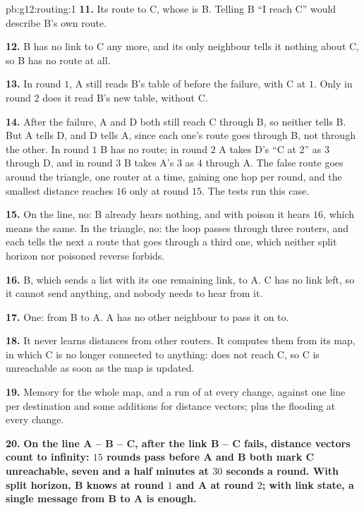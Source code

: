 \begin{solution}{pb:g12:routing:1}
\textbf{11.} Its route to C, whose  is B. Telling B ``I reach C'' would describe B's own route.

\textbf{12.} B has no link to C any more, and its only neighbour tells it nothing about C, so B has no route at all.

\textbf{13.} In round $1$, A still reads B's table of before the failure, with C at $1$. Only in round $2$ does it
read B's new table, without C.

\textbf{14.} After the failure, A and D both still reach C through B, so neither tells B. But A tells D, and D tells
A, since each one's route goes through B, not through the other. In round $1$ B has no route; in round $2$ A takes
D's ``C at $2$'' as $3$ through D, and in round $3$ B takes A's $3$ as $4$ through A. The false route goes around the
triangle, one router at a time, gaining one hop per round, and the smallest distance reaches $16$ only at round
$15$. The tests run this case.

\textbf{15.} On the line, no: B already hears nothing, and with poison it hears $16$, which means the same. In the
triangle, no: the loop passes through three routers, and each tells the next a route that goes through a third one,
which neither split horizon nor poisoned reverse forbids.

\textbf{16.} B, which sends a list with its one remaining link, to A. C has no link left, so it cannot send anything,
and nobody needs to hear from it.

\textbf{17.} One: from B to A. A has no other neighbour to pass it on to.

\textbf{18.} It never learns distances from other routers. It computes them from its map, in which C is no longer
connected to anything:  does not reach C, so C is unreachable as soon as the map is updated.

\textbf{19.} Memory for the whole map, and a run of  at every change, against one line per
destination and some additions for distance vectors; plus the flooding at every change.

\textbf{20.} \textbf{On the line A -- B -- C, after the link B -- C fails, distance vectors count to infinity: $15$
rounds pass before A and B both mark C unreachable, seven and a half minutes at $30$ seconds a round. With split
horizon, B knows at round $1$ and A at round $2$; with link state, a single message from B to A is enough.}
\end{solution}
